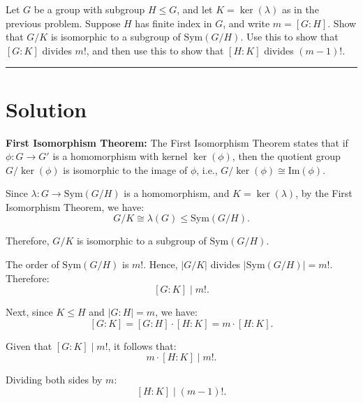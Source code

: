 \documentclass[12pt]{amsart}
\theoremstyle{definition}
\numberwithin{equation}{section}
\begin{document}
\begin{exercise}{2} Let \(G\) be a group with subgroup \(H \leq G\), and let \(K = \ker(\lambda)\) as in the previous problem. Suppose \(H\) has finite index in \(G\), and write \(m = [G:H]\). Show that \(G/K\) is isomorphic to a subgroup of \(\text{Sym}(G/H)\). Use this to show that \([G:K]\) divides \(m!\), and then use this to show that \([H:K]\) divides \((m-1)!\).

    \noindent\rule{\linewidth}{1pt}

    \section*{Solution}
    
    \noindent \textbf{First Isomorphism Theorem:} The First Isomorphism Theorem states that if \( \phi: G \to G' \) is a homomorphism with kernel \( \ker(\phi) \), then the quotient group \( G / \ker(\phi) \) is isomorphic to the image of \( \phi \), i.e., \( G / \ker(\phi) \cong \text{Im}(\phi) \).
    
    Since \(\lambda : G \rightarrow \text{Sym}(G/H)\) is a homomorphism, and \(K = \ker(\lambda)\), by the First Isomorphism Theorem, we have:
    \[
    G/K \cong \lambda(G) \leq \text{Sym}(G/H).
    \]

    Therefore, \(G/K\) is isomorphic to a subgroup of \(\text{Sym}(G/H)\).

    The order of \(\text{Sym}(G/H)\) is \(m!\). Hence, \(|G/K|\) divides \(|\text{Sym}(G/H)| = m!\). Therefore:
    \[
    [G:K] \mid m!.
    \]

    Next, since \(K \leq H\) and \(|G:H| = m\), we have:
    \[
    [G:K] = [G:H] \cdot [H:K] = m \cdot [H:K].
    \]
    
    Given that \([G:K] \mid m!\), it follows that:
    \[
    m \cdot [H:K] \mid m!.
    \]

    Dividing both sides by \(m\):
    \[
    [H:K] \mid (m-1)!.
    \]

\end{exercise}
\newpage
\end{document}
